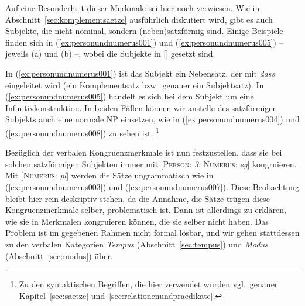 Auf eine Besonderheit dieser Merkmale sei hier noch verwiesen.
Wie in Abschnitt~\ref{sec:komplementsaetze} ausführlich diskutiert wird, gibt es auch Subjekte, die nicht nominal, sondern (neben)satzförmig sind.
Einige Beispiele finden sich in (\ref{ex:personundnumerus001}) und (\ref{ex:personundnumerus005}) -- jeweils (a) und (b) --, wobei die Subjekte in [] gesetzt sind.

\Enl

\begin{exe}
  \ex\label{ex:personundnumerus001}
  \begin{xlist}
  \end{xlist}
  \ex\label{ex:personundnumerus005}
  \begin{xlist}
  \end{xlist}
\end{exe}

In (\ref{ex:personundnumerus001}) ist das Subjekt ein Nebensatz, der mit \textit{dass} eingeleitet wird (ein Komplementsatz bzw.\ genauer ein Subjektsatz).
In (\ref{ex:personundnumerus005}) handelt es sich bei dem Subjekt um eine Infinitivkonstruktion.
In beiden Fällen können wir anstelle des satzförmigen Subjekts auch eine normale NP einsetzen, wie in (\ref{ex:personundnumerus004}) und (\ref{ex:personundnumerus008}) zu sehen ist.%
\footnote{Zu den syntaktischen Begriffen, die hier verwendet wurden vgl.\ genauer Kapitel~\ref{sec:saetze} und~\ref{sec:relationenundpraedikate}.}

Bezüglich der verbalen Kongruenzmerkmale ist nun festzustellen, dass sie bei solchen satzförmigen Subjekten immer mit [\textsc{Person}: \textit{3}, \textsc{Numerus}: \textit{sg}] kongruieren.
Mit [\textsc{Numerus}: \textit{pl}] werden die Sätze ungrammatisch wie in (\ref{ex:personundnumerus003}) und (\ref{ex:personundnumerus007}).
Diese Beobachtung bleibt hier rein deskriptiv stehen, da die Annahme, die Sätze trügen diese Kongruenzmerkmale selber, problematisch ist.
Dann ist allerdings zu erklären, wie sie in Merkmalen kongruieren können, die sie selber nicht haben.
Das Problem ist im gegebenen Rahmen nicht formal lösbar, und wir gehen stattdessen zu den verbalen Kategorien \textit{Tempus} (Abschnitt~\ref{sec:tempus}) und \textit{Modus} (Abschnitt~\ref{sec:modus}) über.

